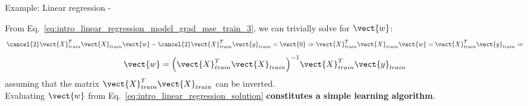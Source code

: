 \begin{frame}[t,allowframebreaks]{
    Example: Linear regression - }
    \framebreak


    From Eq.~\ref{eq:intro_linear_regression_model_grad_mse_train_3},
    we can trivially solve for $\vect{w}$:
    \begin{equation*}
        \cancel{2} \vect{X}_{train}^T \vect{X}_{train} \vect{w}
        - \cancel{2} \vect{X}_{train}^T \vect{y}_{train}
        = \vect{0} \Rightarrow
        \vect{X}_{train}^T \vect{X}_{train} \vect{w} =
        \vect{X}_{train}^T \vect{y}_{train}
        \Rightarrow
    \end{equation*}
    \begin{equation}
        \vect{w} =
        \Big(\vect{X}_{train}^T \vect{X}_{train} \Big)^{-1} 
        \vect{X}_{train}^T \vect{y}_{train}
        \label{eq:intro_linear_regression_solution}
    \end{equation}
    assuming that the matrix 
    $\vect{X}_{train}^T \vect{X}_{train}$ can be inverted.\\
    \vspace{0.2cm}
    Evaluating $\vect{w}$ from Eq.~\ref{eq:intro_linear_regression_solution}
    {\bf constitutes a simple learning algorithm}.

\end{frame}
